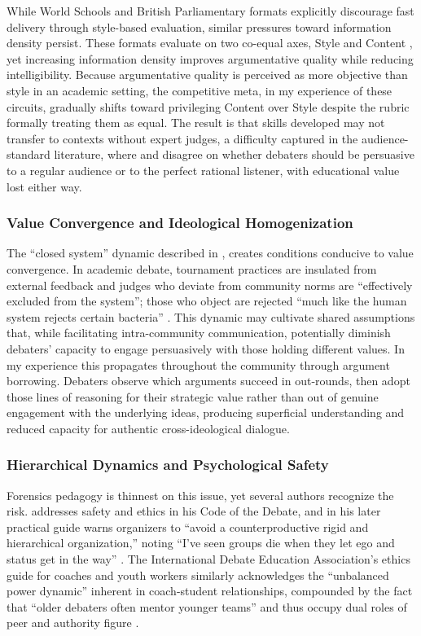 While World Schools and British Parliamentary formats explicitly discourage fast delivery through style-based evaluation, similar pressures toward information density persist. These formats evaluate on two co-equal axes, Style and Content \parencite{harveysmith2011practical}, yet increasing information density improves argumentative quality while reducing intelligibility. Because argumentative quality is perceived as more objective than style in an academic setting, the competitive meta, in my experience of these circuits, gradually shifts toward privileging Content over Style despite the rubric formally treating them as equal. The result is that skills developed may not transfer to contexts without expert judges, a difficulty captured in the audience-standard literature, where \textcite{hicks1998public} and \textcite{weiss2002audience} disagree on whether debaters should be persuasive to a regular audience or to the perfect rational listener, with educational value lost either way.

\subsubsection{Value Convergence and Ideological Homogenization}

The ``closed system'' dynamic described in \textcite{combs2002applying}, creates conditions conducive to value convergence. In academic debate, tournament practices are insulated from external feedback and judges who deviate from community norms are ``effectively excluded from the system''; those who object are rejected ``much like the human system rejects certain bacteria'' \parencite[p.~40]{combs2002applying}. This dynamic may cultivate shared assumptions that, while facilitating intra-community communication, potentially diminish debaters' capacity to engage persuasively with those holding different values. In my experience this propagates throughout the community through argument borrowing. Debaters observe which arguments succeed in out-rounds, then adopt those lines of reasoning for their strategic value rather than out of genuine engagement with the underlying ideas, producing superficial understanding and reduced capacity for authentic cross-ideological dialogue.


\subsubsection{Hierarchical Dynamics and Psychological Safety}

Forensics pedagogy is thinnest on this issue, yet several authors recognize the risk. \textcite{snider1999code} addresses safety and ethics in his Code of the Debate, and in his later practical guide warns organizers to ``avoid a counterproductive rigid and hierarchical organization,'' noting ``I've seen groups die when they let ego and status get in the way'' \parencite[p.~36]{snider2014sparking}. The International Debate Education Association's ethics guide for coaches and youth workers similarly acknowledges the ``unbalanced power dynamic'' inherent in coach-student relationships, compounded by the fact that ``older debaters often mentor younger teams'' and thus occupy dual roles of peer and authority figure \parencite{idea2024ethics}.

